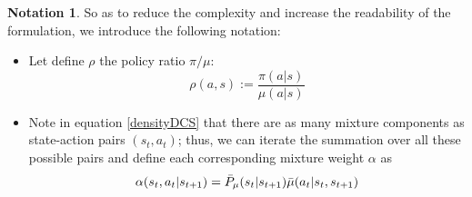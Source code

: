 \documentclass[12pt,a4paper,openright,twoside]{article}
\numberwithin{equation}{section}
\theoremstyle{definition}
\newtheorem*{notation}{Notation}
\theoremstyle{remark}
\theoremstyle{plain}
\begin{document}
\begin{notation}
	So as to reduce the complexity and increase the readability of the formulation, we introduce the following notation:
	
	\begin{itemize}
		\item Let define $\rho$ the policy ratio $\pi / \mu$:
		\begin{equation*}
			\rho(a,s) := \frac{\pi(a|s)}{\mu(a|s)}
		\end{equation*}

	\item Note in equation \ref{densityDCS} that there are as many mixture components as state-action pairs $(s_t,a_t)$; thus, we can iterate the summation over all these possible pairs and define each corresponding mixture weight $\alpha$ as
		\begin{equation*}
			\alpha(s_{t},a_{t}|s_{t+1}) = \Bar{P}_\mu (s_{t} | s_{t+1}) \Bar{\mu}(a_t|s_{t},s_{t+1}) 
		\end{equation*}
	\end{itemize}
\end{notation}
\end{document}
